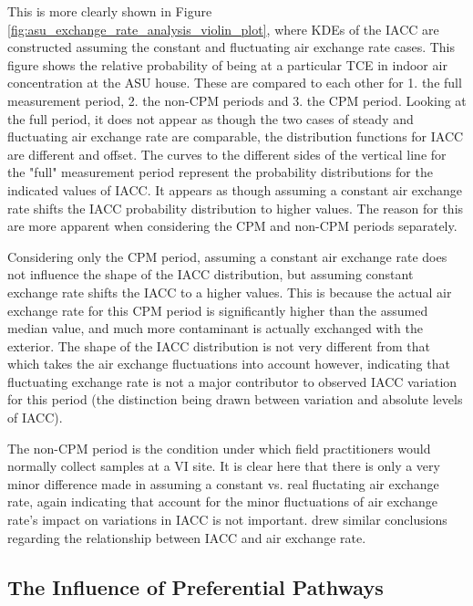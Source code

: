 \documentclass[journal=esthag,manuscript=article]{achemso}
\begin{document}
This is more clearly shown in Figure \ref{fig:asu_exchange_rate_analysis_violin_plot}, where KDEs of the IACC are constructed assuming the constant and fluctuating air exchange rate cases.
This figure shows the relative probability of being at a particular TCE in indoor air concentration at the ASU house.
These are compared to each other for 1. the full measurement period, 2. the non-CPM periods and 3. the CPM period.
Looking at the full period, it does not appear as though the two cases of steady and fluctuating air exchange rate are comparable, the distribution functions for IACC are different and offset.
The curves to the different sides of the vertical line for the "full" measurement period represent the probability distributions for the indicated values of IACC.
It appears as though assuming a constant air exchange rate shifts the IACC probability distribution to higher values.
The reason for this are more apparent when considering the CPM and non-CPM periods separately.

Considering only the CPM period, assuming a constant air exchange rate does not influence the shape of the IACC distribution, but assuming constant exchange rate shifts the IACC to a higher values.
This is because the actual air exchange rate for this CPM period is significantly higher than the assumed median value, and much more contaminant is actually exchanged with the exterior.
The shape of the IACC distribution is not very different from that which takes the air exchange fluctuations into account however, indicating that fluctuating exchange rate is not a major contributor to observed IACC variation for this period (the distinction being drawn between variation and absolute levels of IACC).

The non-CPM period is the condition under which field practitioners would normally collect samples at a VI site.
It is clear here that there is only a very minor difference made in assuming a constant vs. real fluctating air exchange rate, again indicating that account for the minor fluctuations of air exchange rate's impact on variations in IACC is not important.
\citeauthor{rackes_time-averaged_2016}\cite{rackes_time-averaged_2016} drew similar conclusions regarding the relationship between IACC and air exchange rate.

\subsection{The Influence of Preferential Pathways}

\end{document}
